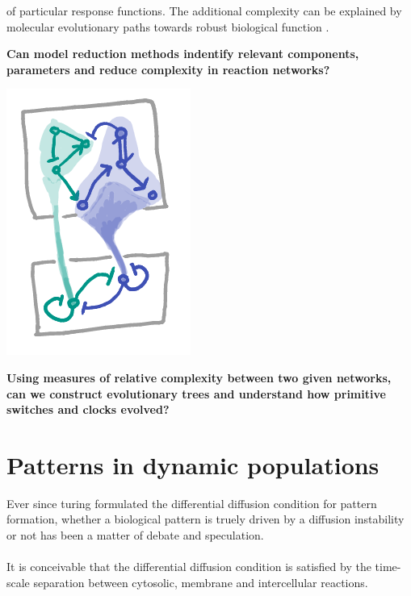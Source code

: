 \documentclass[a0,portrait]{a0poster}
\begin{document}
\begin{multicols}{3}
of particular response functions. The additional complexity can be
explained by molecular evolutionary paths towards robust biological function
\cite{}.
\\
\begin{tcolorbox}[boxrule=2pt,arc=3.4pt,boxsep=2mm]
\begin{center}\color{DarkRed}
\textbf{Can model reduction methods \cite{} indentify relevant components,
parameters \cite{} and reduce complexity in reaction networks?}
\end{center}
\end{tcolorbox}
\begin{center}
\includegraphics[width=0.6\linewidth]{reduction}
\end{center}
\begin{tcolorbox}[boxrule=2pt,arc=3.4pt,boxsep=2mm]
\begin{center}\color{DarkRed}
\textbf{Using measures of relative complexity between two given networks,
can we construct evolutionary trees and understand how primitive switches
and clocks evolved?}
\end{center}
\end{tcolorbox}
\vfill\null
\columnbreak
\section{Patterns in dynamic populations}
Ever since turing formulated the differential diffusion condition \cite{}
for pattern formation, whether a biological pattern is truely driven by a
diffusion instability or not has been a matter of debate and speculation.
\\\\
It is conceivable that the differential diffusion condition is satisfied
by the time-scale separation between cytosolic, membrane and intercellular
reactions.


\end{multicols}
\end{document}

